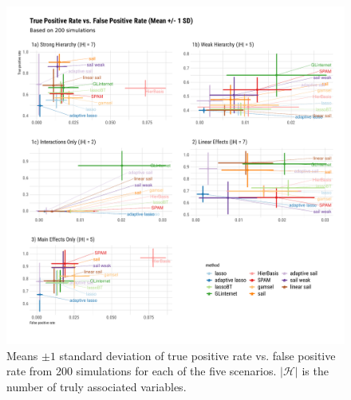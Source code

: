 \documentclass[12pt,letter]{article}\usepackage[]{graphicx}\usepackage[]{color}
\newenvironment{knitrout}{}{} %
\begin{document}
\begin{knitrout}\scriptsize
{}\color{fgcolor}\begin{figure}[H]

{\centering \includegraphics[width=1\linewidth]{figure/plot-tpr-fpr-sim-1} 

}

\caption[Means $\pm 1$ standard deviation of true positive rate vs]{Means $\pm 1$ standard deviation of true positive rate vs. false positive rate from 200 simulations for each of the five scenarios. $|\mathcal{H}|$ is the number of truly associated variables.}\label{fig:plot-tpr-fpr-sim}
\end{figure}


\end{knitrout}
\end{document}
